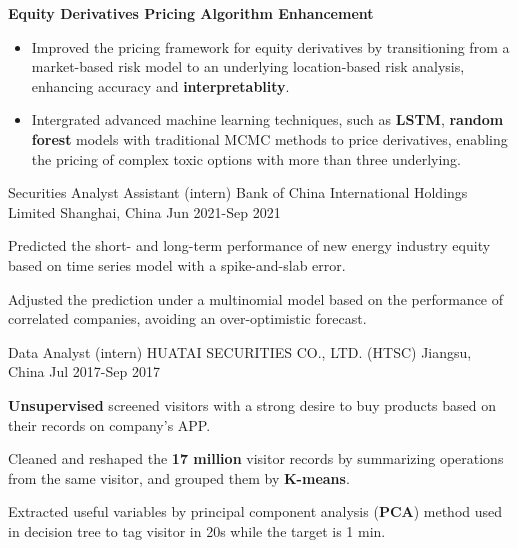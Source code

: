 \begin{cventries}
{\begin{cvitems}
\begin{itemize}
        \end{itemize}
        \item \textbf{Equity Derivatives Pricing Algorithm Enhancement}
        \begin{itemize}
          \item Improved the pricing framework for equity derivatives by transitioning from a market-based risk model to an underlying location-based risk analysis, enhancing accuracy and \textbf{interpretablity}.
          \item Intergrated advanced machine learning techniques, such as \textbf{LSTM}, \textbf{random forest} models with traditional MCMC methods to price derivatives, enabling the pricing of complex toxic options with more than three underlying.
        \end{itemize}
      \end{cvitems}
    }
    \vspace{1.2em}

  \cventry
    {Securities Analyst Assistant (intern)} %
    {Bank of China International Holdings Limited} %
    {Shanghai, China} %
    {Jun 2021-Sep 2021} %
    {
      \begin{cvitems} %
        \item {Predicted the short- and long-term performance of new energy industry equity based on time series model with a spike-and-slab error.}
        \item {Adjusted the prediction under a multinomial model based on the performance of correlated companies, avoiding an over-optimistic forecast.}
      \end{cvitems}
    }
    \vspace{1.2em}
  \cventry
    {Data Analyst (intern)} %
    {HUATAI SECURITIES CO., LTD. (HTSC)} %
    {Jiangsu, China} %
    {Jul 2017-Sep 2017} %
    {
      \begin{cvitems} %
        \item {\textbf{Unsupervised} screened visitors with a strong desire to buy products based on their records on company’s APP.}
        \item {Cleaned and reshaped the \textbf{17 million} visitor records by summarizing operations from the same visitor, and grouped them by \textbf{K-means}.}
        \item {Extracted useful variables by principal component analysis (\textbf{PCA}) method used in decision tree to tag visitor in 20s while the target is 1 min.}
      \end{cvitems}
    }



\end{cventries}
